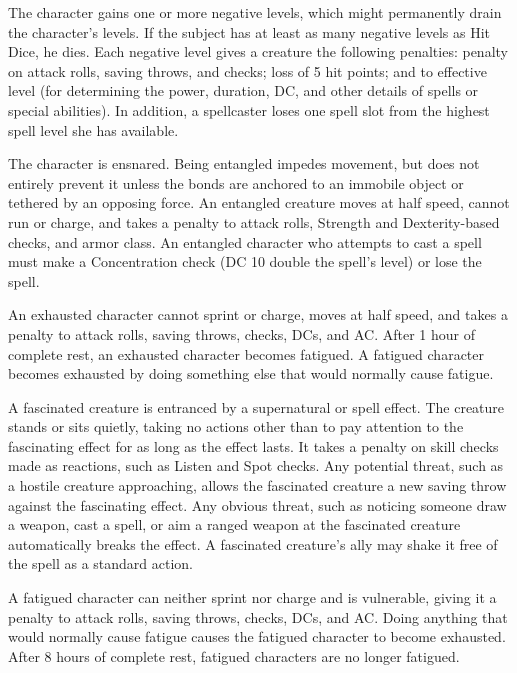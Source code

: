  The character gains one or more negative levels, which might permanently drain the character's levels. If the subject has at least as many negative levels as Hit Dice, he dies. Each negative level gives a creature the following penalties:  penalty on attack rolls, saving throws, and checks; loss of 5 hit points; and  to effective level (for determining the power, duration, DC, and other details of spells or special abilities). In addition, a spellcaster loses one spell slot from the highest spell level she has available.

 The character is ensnared. Being entangled impedes movement, but does not entirely prevent it unless the bonds are anchored to an immobile object or tethered by an opposing force. An entangled creature moves at half speed, cannot run or charge, and takes a  penalty to attack rolls, Strength and Dexterity-based checks, and armor class. An entangled character who attempts to cast a spell must make a Concentration check (DC 10 \add double the spell's level) or lose the spell.

 An exhausted character cannot sprint or charge, moves at half speed, and takes a  penalty to attack rolls, saving throws, checks, DCs, and AC. After 1 hour of complete rest, an exhausted character becomes fatigued. A fatigued character becomes exhausted by doing something else that would normally cause fatigue.

 A fascinated creature is entranced by a supernatural or spell effect. The creature stands or sits quietly, taking no actions other than to pay attention to the fascinating effect for as long as the effect lasts. It takes a  penalty on skill checks made as reactions, such as Listen and Spot checks. Any potential threat, such as a hostile creature approaching, allows the fascinated creature a new saving throw against the fascinating effect. Any obvious threat, such as noticing someone draw a weapon, cast a spell, or aim a ranged weapon at the fascinated creature automatically breaks the effect. A fascinated creature's ally may shake it free of the spell as a standard action.

 A fatigued character can neither sprint nor charge and is vulnerable, giving it a  penalty to attack rolls, saving throws, checks, DCs, and AC. Doing anything that would normally cause fatigue causes the fatigued character to become exhausted. After 8 hours of complete rest, fatigued characters are no longer fatigued.

